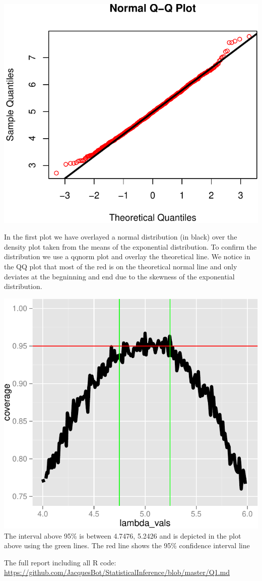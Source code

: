 \documentclass[]{article}
\begin{document}
\includegraphics{./Q1_files/figure-latex/Q3_2.pdf}

In the first plot we have overlayed a normal distribution (in black)
over the density plot taken from the means of the exponential
distribution. To confirm the distribution we use a qqnorm plot and
overlay the theoretical line. We notice in the QQ plot that most of the
red is on the theoretical normal line and only deviates at the
begninning and end due to the skewness of the exponential distribution.

\includegraphics{./Q1_files/figure-latex/Q4.pdf} The interval above 95\%
is between 4.7476, 5.2426 and is depicted in the plot above using the
green lines. The red line shows the 95\% confidence interval line

The full report including all R code:
\href{}{\url{https://github.com/JacquesBot/StatisticalInference/blob/master/Q1.md}}
\end{document}
